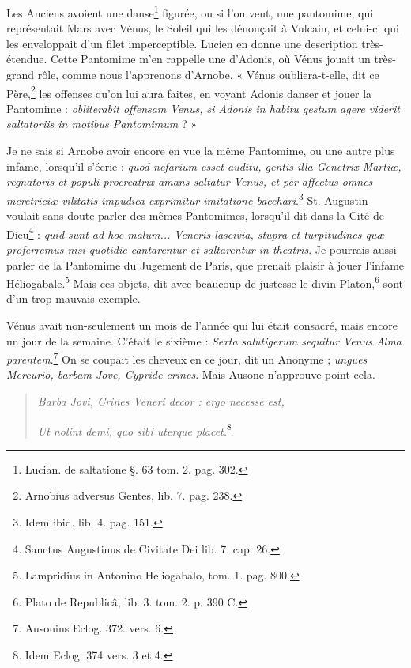 \documentclass[a4paper, 11pt, oneside, polutonikogreek, french]{article}
\begin{document}
Les Anciens avoient une danse\footnote{Lucian. de saltatione §. 63 tom. 2. pag. 302.} figurée, ou si l'on veut, une pantomime, qui représentait Mars avec Vénus, le Soleil qui les dénonçait à Vulcain, et celui-ci qui les enveloppait d'un filet imperceptible. Lucien en donne une description très-étendue. Cette Pantomime m'en rappelle une d'Adonis, où Vénus jouait un très-grand rôle, comme nous l'apprenons d'Arnobe. « Vénus oubliera-t-elle, dit ce Père,\footnote{Arnobius adversus Gentes, lib. 7. pag. 238.} les offenses qu'on lui aura faites, en voyant Adonis danser et jouer la Pantomime : \emph{obliterabit offensam Venus, si Adonis in habitu gestum agere viderit saltatoriis in motibus Pantomimum} ? »

Je ne sais si Arnobe avoir encore en vue la même Pantomime, ou une autre plus infame, lorsqu'il s'écrie : \emph{quod nefarium esset auditu, gentis illa Genetrix Martiœ, regnatoris et populi procreatrix amans saltatur Venus, et per affectus omnes meretriciæ vilitatis impudica exprimitur imitatione bacchari}.\footnote{Idem ibid. lib. 4. pag. 151.} St. Augustin voulait sans doute parler des mêmes Pantomimes, lorsqu'il dit dans la Cité de Dieu\footnote{Sanctus Augustinus de Civitate Dei lib. 7. cap. 26.} : \emph{quid sunt ad hoc malum... Veneris lascivia, stupra et turpitudines quæ proferremus nisi quotidie cantarentur et saltarentur in theatris}. Je pourrais aussi parler de la Pantomime du Jugement de Paris, que prenait plaisir à jouer l'infame Héliogabale.\footnote{Lampridius in Antonino Heliogabalo, tom. 1. pag. 800.} Mais ces objets, dit avec beaucoup de justesse le divin Platon,\footnote{Plato de Republicâ, lib. 3. tom. 2. p. 390 C.} sont d'un trop mauvais exemple.

Vénus avait non-seulement un mois de l'année qui lui était consacré, mais encore un jour de la semaine. C'était le sixième : \emph{Sexta salutigerum sequitur Venus Alma parentem}.\footnote{Ausonins Eclog. 372. vers. 6.} On se coupait les cheveux en ce jour, dit un Anonyme ; \emph{ungues Mercurio, barbam Jove, Cypride crines}. Mais Ausone n'approuve point cela.
\begin{quotation}
\emph{Barba Jovi, Crines Veneri decor : ergo necesse est,}

\emph{Ut nolint demi, quo sibi uterque placet.}\footnote{Idem Eclog. 374 vers. 3 et 4.}
\end{quotation}
\end{document}
